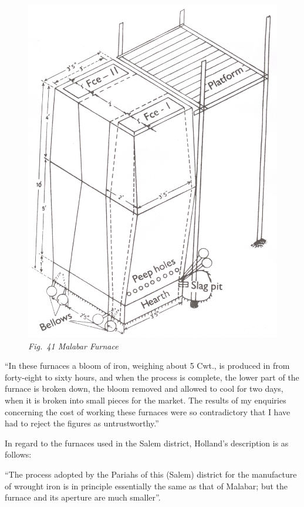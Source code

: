 \begin{figure}[H]
\includegraphics[scale=.1]{images/chapter-6/Fig41.jpg}
\caption*{\textit{Fig.~41 Malabar Furnace}}
\end{figure}

``In these furnaces a bloom of iron, weighing about 5 Cwt., is produced in from forty-eight to sixty hours, and when the process is complete, the lower part of the furnace is broken down, the bloom removed and allowed to cool for two days, when it is broken into small pieces for the market. The results of my enquiries concerning the cost of working these furnaces were so contradictory that I have had to reject the figures as untrustworthy.”

In regard to the furnaces used in the Salem district, Holland’s description is as follows: 

“The process adopted by the Pariahs of this (Salem) district for the manufacture of wrought iron is in principle essentially the same as that of Malabar; but the furnace and its aperture are much smaller”. 

